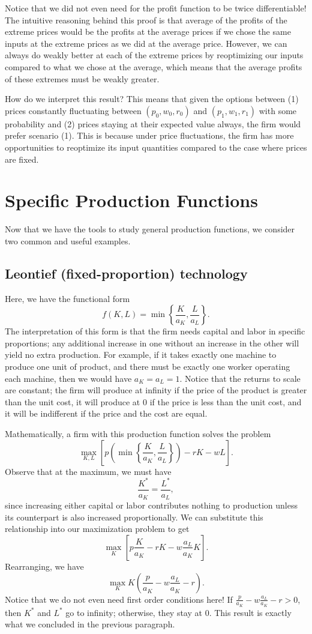 Notice that we did not even need for the profit function to be twice differentiable! The intuitive reasoning behind this proof is that average of the profits of the extreme prices would be the profits at the average prices if we chose the same inputs at the extreme prices as we did at the average price. However, we can always do weakly better at each of the extreme prices by reoptimizing our inputs compared to what we chose at the average, which means that the average profits of these extremes must be weakly greater.

How do we interpret this result? This means that given the options between (1) prices constantly fluctuating between $(p_0, w_0, r_0)$ and $(p_1, w_1, r_1)$ with some probability and (2) prices staying at their expected value always, the firm would prefer scenario (1). This is because under price fluctuations, the firm has more opportunities to reoptimize its input quantities compared to the case where prices are fixed.

\section{Specific Production Functions}
Now that we have the tools to study general production functions, we consider two common and useful examples.


\subsection*{Leontief (fixed-proportion) technology}

Here, we have the functional form
$$f(K, L)=\min \left\{\frac{K}{a_{K}}, \frac{L}{a_{L}}\right\}.$$
The interpretation of this form is that the firm needs capital and labor in specific proportions; any additional increase in one without an increase in the other will yield no extra production. For example, if it takes exactly one machine to produce one unit of product, and there must be exactly one worker operating each machine, then we would have $a_K = a_L = 1$. Notice that the returns to scale are constant; the firm will produce at infinity if the price of the product is greater than the unit cost, it will produce at 0 if the price is less than the unit cost, and it will be indifferent if the price and the cost are equal.

Mathematically, a firm with this production function solves the problem
$$\max_{K, L} \left[p\left(\min\left\{\frac{K}{a_K}, \frac{L}{a_L}\right\}\right) - rK - wL\right].$$
Observe that at the maximum, we must have
$$\frac{K^*}{a_K} = \frac{L^*}{a_L},$$
since increasing either capital or labor contributes nothing to production unless its counterpart is also increased proportionally. We can substitute this relationship into our maximization problem to get
$$\max_{K} \left[p\frac{K}{a_K} - rK - w\frac{a_L}{a_K}K\right].$$
Rearranging, we have 
$$\max_{K} K\left(\frac{p}{a_K} - w\frac{a_L}{a_K} - r\right).$$
Notice that we do not even need first order conditions here! If $\frac{p}{a_K} - w\frac{a_L}{a_K} - r > 0$, then $K^*$ and $L^*$ go to infinity; otherwise, they stay at 0. This result is exactly what we concluded in the previous paragraph.

